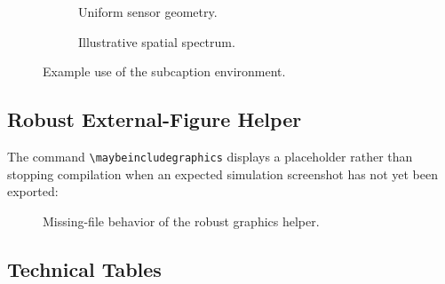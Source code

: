 \begin{figure}[H]
    \centering
    \begin{subfigure}[t]{0.47\textwidth}
        \centering
        \caption{Uniform sensor geometry.}
        \label{fig:sub-array}
    \end{subfigure}
    \hfill
    \begin{subfigure}[t]{0.47\textwidth}
        \centering
        \caption{Illustrative spatial spectrum.}
        \label{fig:sub-spectrum}
    \end{subfigure}
    \caption{Example use of the subcaption environment.}
    \label{fig:subfigures}
\end{figure}

\subsection{Robust External-Figure Helper}

The command \verb|\maybeincludegraphics| displays a placeholder rather than stopping
compilation when an expected simulation screenshot has not yet been exported:
\begin{figure}[H]
    \centering
    \caption{Missing-file behavior of the robust graphics helper.}
    \label{fig:missing-example}
\end{figure}

\subsection{Technical Tables}

